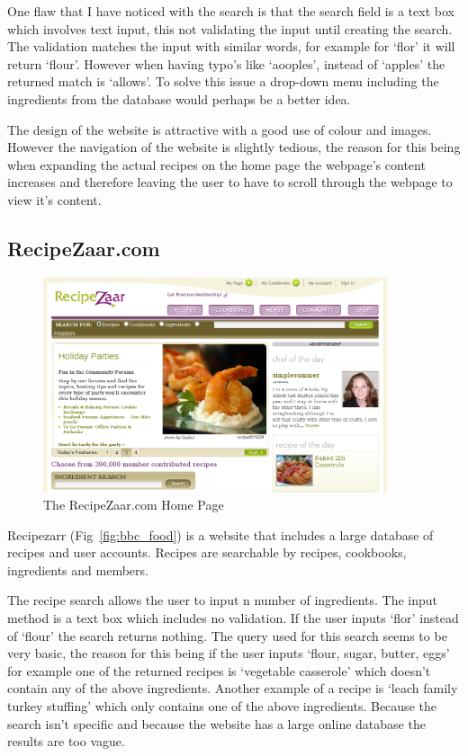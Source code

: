 One flaw that I have noticed with the search is that the search field is a text box which involves text input, this not validating the input until creating the search. The validation matches the input with similar words, for example for ‘flor’ it will return ‘flour’. However when having typo’s like ‘aooples’, instead of ‘apples’ the returned match is ‘allows’. To solve this issue a drop-down menu including the ingredients from the database would perhaps be a better idea.

The design of the website is attractive with a good use of colour and images. However the navigation of the website is slightly tedious, the reason for this being when expanding the actual recipes on the home page the webpage’s content increases and therefore leaving the user to have to scroll through the webpage to view it’s content. 



\subsection{RecipeZaar.com}

\begin{figure}
\includegraphics[width=0.9\textwidth]{screenshot_recipezaar}
\caption{The RecipeZaar.com Home Page}
\label{fig:recipezaar}
\end{figure}

Recipezarr (Fig~\ref{fig:bbc_food}) is a website that includes a large database of recipes and user accounts. Recipes are searchable by recipes, cookbooks, ingredients and members. 

The recipe search allows the user to input n number of ingredients. The input method is a text box which includes no validation. If the user inputs ‘flor’ instead of ‘flour’ the search returns nothing. The query used for this search seems to be very basic, the reason for this being if the user inputs ‘flour, sugar, butter, eggs’ for example one of the returned recipes is ‘vegetable casserole’ which doesn’t contain any of the above ingredients. Another example of a recipe is ‘leach family turkey stuffing’ which only contains one of the above ingredients. Because the search isn’t specific and because the website has a large online database the results are too vague.

